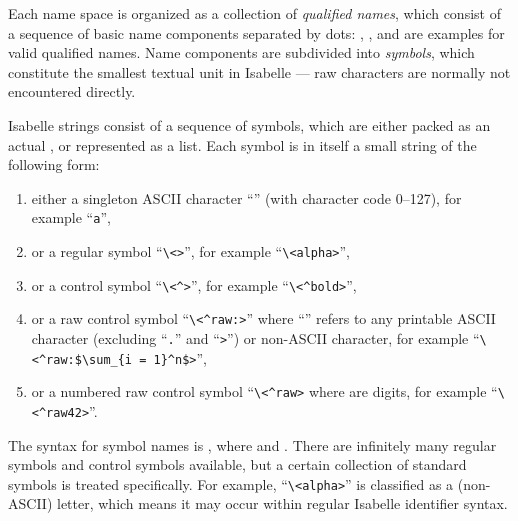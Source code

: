 \begin{isabellebody}
\begin{isamarkuptext}
Each name space is organized as a collection of \emph{qualified
names}, which consist of a sequence of basic name components separated
by dots: , , and 
are examples for valid qualified names.  Name components are
subdivided into \emph{symbols}, which constitute the smallest textual
unit in Isabelle --- raw characters are normally not encountered
directly.%
\end{isamarkuptext}%
\isamarkuptrue%
%
\isamarkuptrue%
%
\begin{isamarkuptext}%
Isabelle strings consist of a sequence of
symbols, which are either packed as an
actual , or represented as a list.  Each symbol is in
itself a small string of the following form:

\begin{enumerate}

\item either a singleton ASCII character ``'' (with
character code 0--127), for example ``\verb,a,'',

\item or a regular symbol ``\verb,\,\verb,<,\verb,>,'',
for example ``\verb,\,\verb,<alpha>,'',

\item or a control symbol ``\verb,\,\verb,<^,\verb,>,'', for example ``\verb,\,\verb,<^bold>,'',

\item or a raw control symbol ``\verb,\,\verb,<^raw:,\isa{{\isasymdots}}\verb,>,'' where ``\isa{{\isasymdots}}'' refers to any
printable ASCII character (excluding ``\verb,.,'' and ``\verb,>,'') or
non-ASCII character, for example ``\verb,\,\verb,<^raw:$\sum_{i = 1}^n$>,'',

\item or a numbered raw control symbol ``\verb,\,\verb,<^raw,\verb,>, where  are digits, for example
``\verb,\,\verb,<^raw42>,''.

\end{enumerate}

The  syntax for symbol names is , where  and .  There are infinitely many regular symbols and
control symbols available, but a certain collection of standard
symbols is treated specifically.  For example,
``\verb,\,\verb,<alpha>,'' is classified as a (non-ASCII) letter,
which means it may occur within regular Isabelle identifier syntax.


\end{isamarkuptext}
\end{isabellebody}
